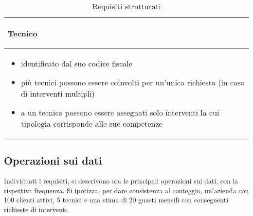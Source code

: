 \documentclass{article}
\begin{document}
\begin{table}[h]
\begin{tabular}{|m{17cm}|}
        \hline
        \begin{center}\textbf{Tecnico}\end{center} \\
        \hline
        \begin{itemize}
            \item identificato dal suo codice fiscale
            \item più tecnici possono essere coinvolti per un'unica richiesta (in caso di interventi multipli)
            \item a un tecnico possono essere assegnati solo interventi la cui tipologia corrisponde alle sue competenze 
        \end{itemize} \\
        \hline
    \end{tabular}
    \caption{Requisiti strutturati}
    \label{tab:op_freq}
\end{table}

\newpage

\subsection{Operazioni sui dati}

Individuati i requisiti, si descrivono ora le principali operazioni sui dati, con la rispettiva frequenza.
Si ipotizza, per dare consistenza al conteggio, un'azienda con 100 clienti attivi, 5 tecnici e una stima di 20 guasti mensili con conseguenti richieste di interventi.
\end{document}
